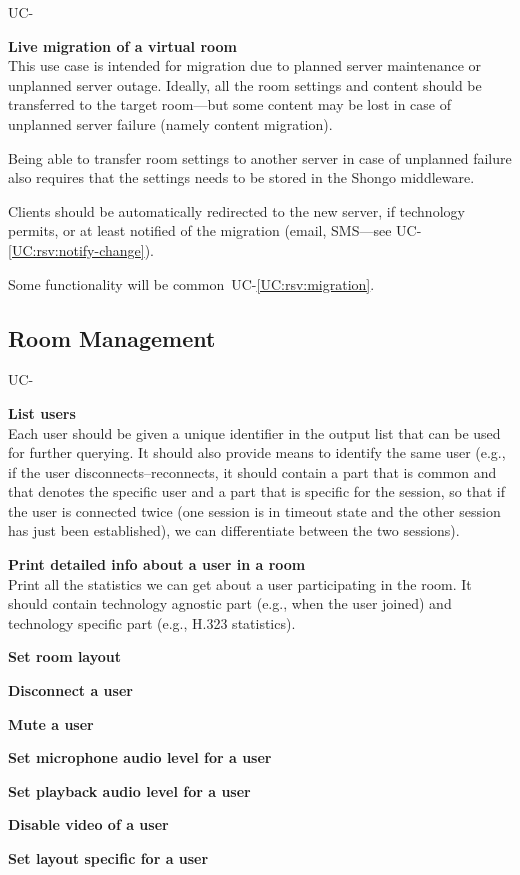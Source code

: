 \documentclass[a4paper]{report}
\makeatletter
\newcounter{UCcounter}
\newenvironment{UseCases}%
	{\begin{list}{UC-\arabic{UCcounter}}{\@nmbrlisttrue\def\@listctr{UCcounter}}}%
	{\end{list}}
\newcommand{\UClabel}[1]{\label{UC:#1}}
\newcommand{\UCref}[1]{UC-\ref{UC:#1}}
\newcommand{\UseCase}[2]{\item\UClabel{#2} \textbf{#1}\\}
\makeatother
\begin{document}
\begin{UseCases}

\UseCase{Live migration of a virtual room}{ops:migration}

This use case is intended for migration due to planned server maintenance or
unplanned server outage.  Ideally, all the room settings and content should be
transferred to the target room---but some content may be lost in case of
unplanned server failure (namely content migration).

Being able to transfer room settings to another server in case of unplanned
failure also requires that the settings needs to be stored in the Shongo
middleware.

Clients should be automatically redirected to the new server, if technology
permits, or at least notified of the migration (email, SMS---see
\UCref{rsv:notify-change}).

Some functionality will be common~\UCref{rsv:migration}.

\end{UseCases}

\subsection{Room Management}

\begin{UseCases}

\UseCase{List users}{ops:room:users-list}

Each user should be given a unique identifier in the output list that can be
used for further querying. It should also provide means to identify the same
user (e.g., if the user disconnects--reconnects, it should contain a part that
is common and that denotes the specific user and a part that is specific for
the session, so that if the user is connected twice (one session is in timeout
state and the other session has just been established), we can differentiate
between the two sessions).

\UseCase{Print detailed info about a user in a room}{ops:room:user-info}

Print all the statistics we can get about a user participating in the room. It
should contain technology agnostic part (e.g., when the user joined) and
technology specific part (e.g., H.323 statistics).

\UseCase{Set room layout}{ops:room:layout}

\UseCase{Disconnect a user}{ops:room:user-disconnect}

\UseCase{Mute a user}{ops:room:user-mute}

\UseCase{Set microphone audio level for a user}{ops:room:user-miclevel}

\UseCase{Set playback audio level for a user}{ops:room:user-playlevel}

\UseCase{Disable video of a user}{ops:room:user-video-off}

\UseCase{Set layout specific for a user}{ops:room:user-layout}

\end{UseCases}
\end{document}
